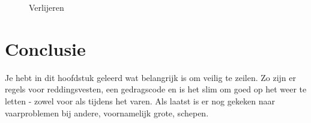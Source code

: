 \begin{center}
\begin{minipage}[b]{0.35\textwidth}
\begin{figure}[H]
        \caption{Verlijeren}
        \label{pic:verlijeren}
    \end{figure}
  \end{minipage}
  \end{center}


\section{Conclusie}
Je hebt in dit hoofdstuk geleerd wat belangrijk is om veilig te zeilen. Zo zijn er regels voor reddingsvesten, een gedragscode en is het slim om goed op het weer te letten - zowel voor als tijdens het varen. Als laatst is er nog gekeken naar vaarproblemen bij andere, voornamelijk grote, schepen. 